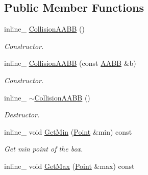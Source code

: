 \subsection*{Public Member Functions}
\begin{DoxyCompactItemize}
\item 
inline\+\_\+ \hyperlink{classOpcode_1_1CollisionAABB_a150e1b36c867344e8caa266f36d38be7}{Collision\+A\+A\+BB} ()\hypertarget{classOpcode_1_1CollisionAABB_a150e1b36c867344e8caa266f36d38be7}{}\label{classOpcode_1_1CollisionAABB_a150e1b36c867344e8caa266f36d38be7}

\begin{DoxyCompactList}\small\item\em Constructor. \end{DoxyCompactList}\item 
inline\+\_\+ \hyperlink{classOpcode_1_1CollisionAABB_a6f5cc59cd54e3a13c74da824c845d2f3}{Collision\+A\+A\+BB} (const \hyperlink{classOpcode_1_1AABB}{A\+A\+BB} \&b)\hypertarget{classOpcode_1_1CollisionAABB_a6f5cc59cd54e3a13c74da824c845d2f3}{}\label{classOpcode_1_1CollisionAABB_a6f5cc59cd54e3a13c74da824c845d2f3}

\begin{DoxyCompactList}\small\item\em Constructor. \end{DoxyCompactList}\item 
inline\+\_\+ \hyperlink{classOpcode_1_1CollisionAABB_ad5f7540bc10a3de478825b2f3d6d460a}{$\sim$\+Collision\+A\+A\+BB} ()\hypertarget{classOpcode_1_1CollisionAABB_ad5f7540bc10a3de478825b2f3d6d460a}{}\label{classOpcode_1_1CollisionAABB_ad5f7540bc10a3de478825b2f3d6d460a}

\begin{DoxyCompactList}\small\item\em Destructor. \end{DoxyCompactList}\item 
inline\+\_\+ void \hyperlink{classOpcode_1_1CollisionAABB_a549c6774357785303f40d0d28c1b9077}{Get\+Min} (\hyperlink{classOpcode_1_1Point}{Point} \&min) const \hypertarget{classOpcode_1_1CollisionAABB_a549c6774357785303f40d0d28c1b9077}{}\label{classOpcode_1_1CollisionAABB_a549c6774357785303f40d0d28c1b9077}

\begin{DoxyCompactList}\small\item\em Get min point of the box. \end{DoxyCompactList}\item 
inline\+\_\+ void \hyperlink{classOpcode_1_1CollisionAABB_a804d7b5bd0c962f9265dc196d0da8049}{Get\+Max} (\hyperlink{classOpcode_1_1Point}{Point} \&max) const \hypertarget{classOpcode_1_1CollisionAABB_a804d7b5bd0c962f9265dc196d0da8049}{}\label{classOpcode_1_1CollisionAABB_a804d7b5bd0c962f9265dc196d0da8049}


\end{DoxyCompactItemize}
